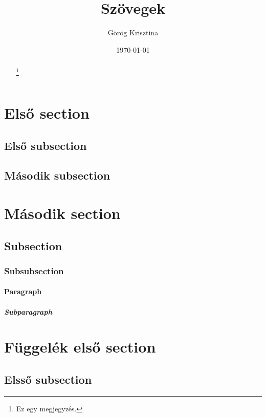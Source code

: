 \documentclass[twocolumn, twoside]{article}
\title{Szövegek}
\author{Görög Krisztina}
\date{\today}
\begin{document}
\pagestyle{headings}
\renewcommand{\thefootnote}{\fnsymbol{footnote}}
\maketitle

\begin{abstract}
\hulipsum[1]\footnote{Ez egy megjegyzés.}
\end{abstract}

\setcounter{tocdepth}{5}
\tableofcontents
\clearpage

\setcounter{secnumdepth}{5}

\section{Első section}
\subsection{Első subsection}
\pagestyle{myheadings}
\hulipsum

\subsection{Második subsection}
\hulipsum

\section[Második]{Második section}
\subsection{Subsection}
\subsubsection{Subsubsection}
\paragraph{Paragraph}
\subparagraph{Subparagraph}

\appendix
\section{Függelék első section}
\subsection{Elsső subsection}
\quote{\hulipsum[2]}
\end{document}
